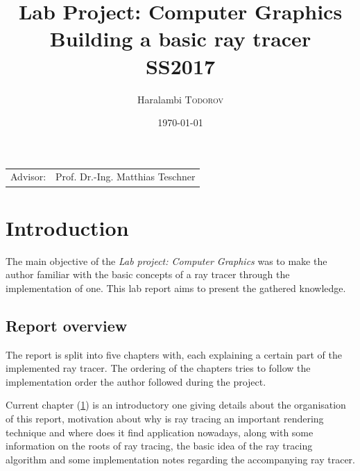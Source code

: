 \documentclass{article}
\title{Lab Project: Computer Graphics \\ Building a basic ray tracer \\ SS2017} %
\author{Haralambi \textsc{Todorov}} %
\date{\today} %
\begin{document}
\maketitle %

\begin{center}
\begin{tabular}{l r}
Advisor: & Prof. Dr.-Ing. Matthias Teschner %
\end{tabular}
\end{center}



\section{Introduction}
\label{sec:intro}
The main objective of the \textit{Lab project: Computer Graphics} was to make the author familiar with the basic concepts of a ray tracer through the implementation of one. This lab report aims to present the gathered knowledge.

\subsection{Report overview}
The report is split into five chapters with, each explaining a certain part of the implemented ray tracer. The ordering of the chapters tries to follow the implementation order the author followed during the project. 

\vspace*{\baselineskip}

Current chapter (\ref{sec:intro}) is an introductory one giving details about the organisation of this report, motivation about why is ray tracing an important rendering technique and where does it find application nowadays, along with some information on the roots of ray tracing, the basic idea of the ray tracing algorithm and some implementation notes regarding the accompanying ray tracer.

\vspace*{\baselineskip}
\end{document}
